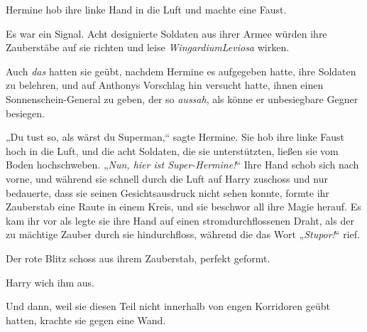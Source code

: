 Hermine hob ihre linke Hand in die Luft und machte eine Faust.

Es war ein Signal. Acht designierte Soldaten aus ihrer Armee würden ihre Zauberstäbe auf sie richten und leise \emph{WingardiumLeviosa} wirken.

Auch \emph{das} hatten sie geübt, nachdem Hermine es aufgegeben hatte, ihre Soldaten zu belehren, und auf Anthonys Vorschlag hin versucht hatte, ihnen einen Sonnenschein-General zu geben, der so \emph{aussah}, als könne er unbesiegbare Gegner besiegen.

„Du tust so, als wärst du Superman,“ sagte Hermine. Sie hob ihre linke Faust hoch in die Luft, und die acht Soldaten, die sie unterstützten, ließen sie vom Boden hochschweben. „\emph{Nun, hier ist Super-Hermine!}“ Ihre Hand schob sich nach vorne, und während sie schnell durch die Luft auf Harry zuschoss und nur bedauerte, dass sie seinen Gesichtsausdruck nicht sehen konnte, formte ihr Zauberstab eine Raute in einem Kreis, und sie beschwor all ihre Magie herauf. Es kam ihr vor als legte sie ihre Hand auf einen stromdurchflossenen Draht, als der zu mächtige Zauber durch sie hindurchfloss, während die das Wort „\emph{Stupor!}“ rief.

Der rote Blitz schoss aus ihrem Zauberstab, perfekt geformt.

Harry wich ihm aus.

Und dann, weil sie diesen Teil nicht innerhalb von engen Korridoren geübt hatten, krachte sie gegen eine Wand.

